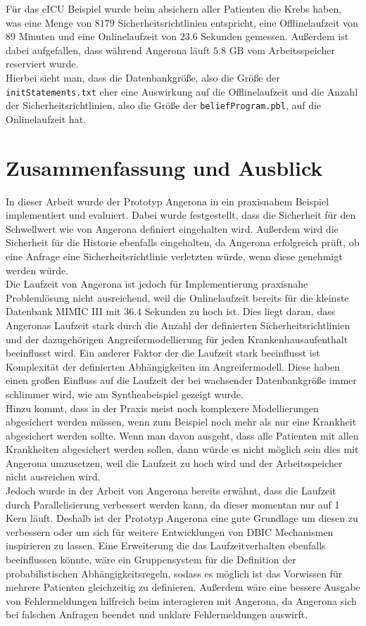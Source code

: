 \documentclass[german,version-2020-11]{uzl-thesis}
\begin{document}
Für das eICU Beispiel wurde beim absichern aller Patienten die Krebs haben, was eine Menge von $8179$ Sicherheitsrichtlinien entspricht, eine Offlinelaufzeit von $89$ Minuten und eine Onlinelaufzeit von $23.6$ Sekunden gemessen. Außerdem ist dabei aufgefallen, dass während Angerona läuft $5.8$ GB vom Arbeitsspeicher reserviert wurde. \\ 
Hierbei sieht man, dass die Datenbankgröße, also die Größe der \texttt{initStatements.txt} eher eine Auswirkung auf die Offlinelaufzeit und die Anzahl der Sicherheitsrichtlinien, also die Größe der \texttt{beliefProgram.pbl}, auf die Onlinelaufzeit hat.

\chapter{Zusammenfassung und Ausblick} \label{chap:Zusammenfassung}
In dieser Arbeit wurde der Prototyp Angerona in ein praxisnahem Beispiel implementiert und evaluiert. Dabei wurde festgestellt, dass die Sicherheit für den Schwellwert wie von Angerona definiert eingehalten wird. Außerdem wird die Sicherheit für die Historie ebenfalls eingehalten, da Angerona erfolgreich prüft, ob eine Anfrage eine Sicherheitsrichtlinie verletzten würde, wenn diese genehmigt werden würde. \\
Die Laufzeit von Angerona ist jedoch für Implementierung praxisnahe Problemlösung nicht ausreichend, weil die Onlinelaufzeit bereits für die kleinste Datenbank MIMIC III mit $36.4$ Sekunden zu hoch ist. Dies liegt daran, dass Angeronas Laufzeit stark durch die Anzahl der definierten Sicherheitsrichtlinien und der dazugehörigen Angreifermodellierung für jeden Krankenhausaufenthalt beeinflusst wird. Ein anderer Faktor der die Laufzeit stark beeinflusst ist Komplexität der definierten Abhängigkeiten im Angreifermodell. Diese haben einen großen Einfluss auf die Laufzeit der bei wachsender Datenbankgröße immer schlimmer wird, wie am Syntheabeispiel gezeigt wurde. \\ 
Hinzu kommt, dass in der Praxis meist noch komplexere Modellierungen abgesichert werden müssen, wenn zum Beispiel noch mehr als nur eine Krankheit abgesichert werden sollte. Wenn man davon ausgeht, dass alle Patienten mit allen Krankheiten abgesichert werden sollen, dann würde es nicht möglich sein dies mit Angerona umzusetzen, weil die Laufzeit zu hoch wird und der Arbeitsspeicher nicht ausreichen wird. \\ 
Jedoch wurde in der Arbeit von Angerona bereits erwähnt, dass die Laufzeit durch Parallelisierung verbessert werden kann, da dieser momentan nur auf 1 Kern läuft. Deshalb ist der Prototyp Angerona eine gute Grundlage um diesen zu verbessern oder um sich für weitere Entwicklungen von DBIC Mechanismen inspirieren zu lassen. Eine Erweiterung die das Laufzeitverhalten ebenfalls beeinflussen könnte, wäre ein Gruppensystem für die Definition der probabilistischen Abhängigkeitsregeln, sodass es möglich ist das Vorwissen für mehrere Patienten gleichzeitig zu definieren. Außerdem wäre eine bessere Ausgabe von Fehlermeldungen hilfreich beim interagieren mit Angerona, da Angerona sich bei falschen Anfragen beendet und unklare Fehlermeldungen auswirft. 
\end{document}

